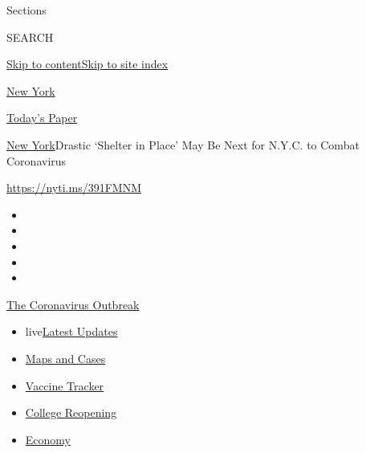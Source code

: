 Sections

SEARCH

\protect\hyperlink{site-content}{Skip to
content}\protect\hyperlink{site-index}{Skip to site index}

\href{https://www.nytimes3xbfgragh.onion/section/nyregion}{New York}

\href{https://myaccount.nytimes3xbfgragh.onion/auth/login?response_type=cookie\&client_id=vi}{}

\href{https://www.nytimes3xbfgragh.onion/section/todayspaper}{Today's
Paper}

\href{/section/nyregion}{New York}\textbar{}Drastic `Shelter in Place'
May Be Next for N.Y.C. to Combat Coronavirus

\url{https://nyti.ms/391FMNM}

\begin{itemize}
\item
\item
\item
\item
\item
\end{itemize}

\href{https://www.nytimes3xbfgragh.onion/news-event/coronavirus?action=click\&pgtype=Article\&state=default\&region=TOP_BANNER\&context=storylines_menu}{The
Coronavirus Outbreak}

\begin{itemize}
\tightlist
\item
  live\href{https://www.nytimes3xbfgragh.onion/2020/08/04/world/coronavirus-cases.html?action=click\&pgtype=Article\&state=default\&region=TOP_BANNER\&context=storylines_menu}{Latest
  Updates}
\item
  \href{https://www.nytimes3xbfgragh.onion/interactive/2020/us/coronavirus-us-cases.html?action=click\&pgtype=Article\&state=default\&region=TOP_BANNER\&context=storylines_menu}{Maps
  and Cases}
\item
  \href{https://www.nytimes3xbfgragh.onion/interactive/2020/science/coronavirus-vaccine-tracker.html?action=click\&pgtype=Article\&state=default\&region=TOP_BANNER\&context=storylines_menu}{Vaccine
  Tracker}
\item
  \href{https://www.nytimes3xbfgragh.onion/2020/08/02/us/covid-college-reopening.html?action=click\&pgtype=Article\&state=default\&region=TOP_BANNER\&context=storylines_menu}{College
  Reopening}
\item
  \href{https://www.nytimes3xbfgragh.onion/live/2020/08/04/business/stock-market-today-coronavirus?action=click\&pgtype=Article\&state=default\&region=TOP_BANNER\&context=storylines_menu}{Economy}
\end{itemize}

